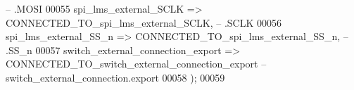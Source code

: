 \begin{DoxyCode}
{        --                                 .MOSI}
00055             spi_lms_external_SCLK                   => CONNECTED\_TO\_spi\_lms\_external\_SCLK,\textcolor{keyword}{                 
        --                                 .SCLK}
00056             spi_lms_external_SS_n                   => CONNECTED\_TO\_spi\_lms\_external\_SS\_n,\textcolor{keyword}{                 
        --                                 .SS\_n}
00057             switch_external_connection_export       => CONNECTED\_TO\_switch\_external\_connection\_export      
        \textcolor{keyword}{--       switch\_external\_connection.export}
00058         \textcolor{vhdlchar}{)};
00059 
\end{DoxyCode}
